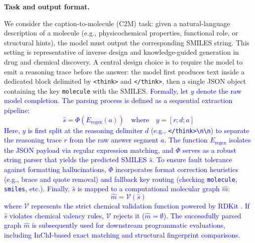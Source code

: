 \documentclass[11pt]{article}
\begin{document}
\noindent\textbf{Task and output format.}

We consider the caption-to-molecule (C2M) task\cite{edwards2022molt5,edwards2021text2mol}: given a natural-language description of a molecule (e.g., physicochemical properties, functional role, or structural hints), the model must output the corresponding SMILES string\cite{weininger1988smiles}. This setting is representative of inverse design and knowledge-guided generation in drug and chemical discovery\cite{segler2018planning,survey2024genai}. A central design choice is to require the model to emit a reasoning trace before the answer: the model first produces text inside a dedicated block delimited by \texttt{<think>} and \texttt{</think>}, then a single JSON object containing the key \texttt{molecule} with the SMILES. 
\textcolor{blue}{Formally, let $y$ denote the raw model completion. The parsing process is defined as a sequential extraction pipeline:
\begin{equation}
\hat{s} = \Phi(E_{\text{regex}}(a)) \quad \text{where} \quad y = [r; d; a]
\label{eq:parsing_pipeline}
\end{equation}
Here, $y$ is first split at the reasoning delimiter $d$ (e.g., \texttt{</think>\textbackslash n\textbackslash n}) to separate the reasoning trace $r$ from the raw answer segment $a$. The function $E_{\text{regex}}$ isolates the JSON payload via regular expression matching, and $\Phi$ serves as a robust string parser that yields the predicted SMILES $\hat{s}$. To ensure fault tolerance against formatting hallucinations, $\Phi$ incorporates format correction heuristics (e.g., brace and quote removal) and fallback key routing (checking \texttt{molecule}, \texttt{smiles}, etc.). Finally, $\hat{s}$ is mapped to a computational molecular graph $\hat{m}$:
\begin{equation}
    \hat{m} = \mathcal{V}(\hat{s})
\end{equation}
where $\mathcal{V}$ represents the strict chemical validation function powered by RDKit \cite{rdkit}. If $\hat{s}$ violates chemical valency rules, $\mathcal{V}$ rejects it ($\hat{m} = \emptyset$). The successfully parsed graph $\hat{m}$ is subsequently used for downstream programmatic evaluations, including InChI-based \cite{heller2015inchi} exact matching and structural fingerprint comparisons.}
\end{document}
